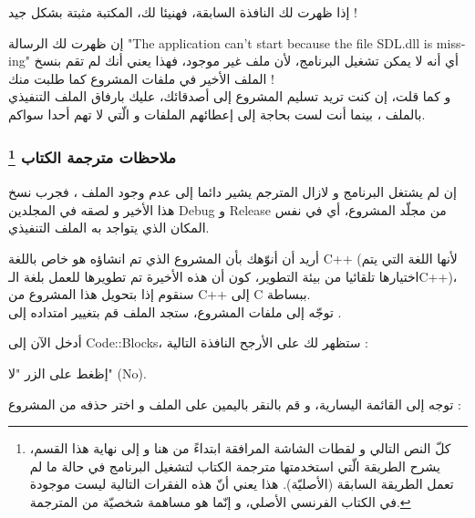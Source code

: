 
إذا ظهرت لك النافذة السابقة، فهنيئا لك، المكتبة مثبتة بشكل جيد !

\begin{information}
إن ظهرت لك الرسالة 
"\textenglish{The application can't start because the file SDL.dll is missing}"
أي أنه لا يمكن تشغيل البرنامج، لأن ملف 
غير موجود، فهذا يعني أنك لم تقم بنسخ الملف الأخير في ملفات المشروع كما طلبت منك !\\
و كما قلت، إن كنت تريد تسليم المشروع إلى أصدقائك، عليك بارفاق الملف التنفيذي 
بالملف 
،
بينما أنت لست بحاجة إلى إعطائهم الملفات 
و
الّتي لا تهم أحدا سواكم.
\end{information}

\subsubsection*{ملاحظات مترجمة الكتاب
\footnote{
كلّ النص التالي و لقطات الشاشة المرافقة ابتداءً من هنا و إلى نهاية هذا القسم، يشرح الطريقة الّتي استخدمتها مترجمة الكتاب لتشغيل البرنامج في حالة ما لم تعمل الطريقة السابقة (الأصليّة). هذا يعني أنّ هذه الفقرات التالية ليست موجودة في الكتاب الفرنسي الأصلي، و إنّما هو مساهمة شخصيّة من المترجمة.}}

إن لم يشتغل البرنامج و لازال المترجم يشير دائما إلى عدم وجود الملف 
،
فجرب نسخ هذا الأخير و لصقه في المجلدين 
\textenglish{Debug}
و 
\textenglish{Release}
من مجلّد المشروع، أي في نفس المكان الذي يتواجد به الملف التنفيذي.

أريد أن أنوّهك بأن المشروع الذي تم انشاؤه هو خاص باللغة 
\textenglish{C++}
(لأنها اللغة التي يتم اختيارها تلقائيا من بيئة التطوير، كون أن هذه الأخيرة تم تطويرها للعمل بلغة الـ\textenglish{C++})،
سنقوم إذا بتحويل هذا المشروع من
\textenglish{C++}
إلى 
\textenglish{C}
ببساطة.\\
توجّه إلى ملفات المشروع، ستجد الملف
قم بتغيير امتداده إلى
.


أدخل الآن إلى
\textenglish{Code::Blocks}،
ستظهر لك على الأرجح النافذة التالية :


إظغط على الزر "لا"
(\textenglish{No}).

توجه إلى القائمة اليسارية، و قم بالنقر باليمين على الملف
و اختر حذفه من المشروع :

